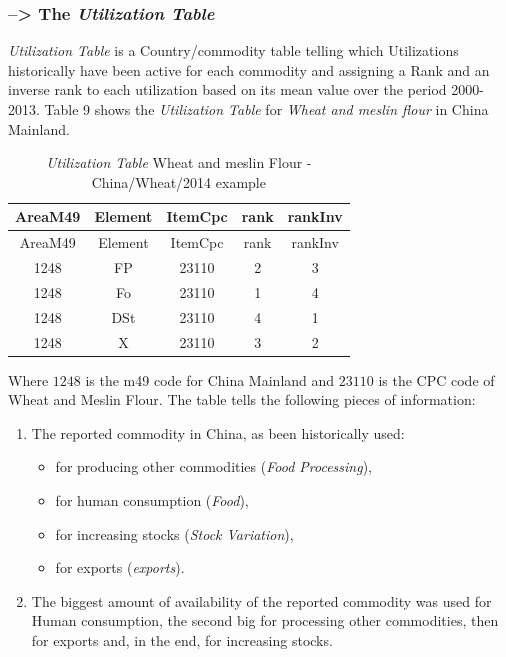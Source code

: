 \documentclass[]{article}
\providecommand{\tightlist}{%
  \setlength{\itemsep}{0pt}\setlength{\parskip}{0pt}}
\begin{document}
\subsubsection*{\texorpdfstring{--\textgreater{} The \emph{Utilization
Table}}{--\textgreater{} The Utilization Table}}\label{the-utilization-table}

\emph{Utilization Table} is a Country/commodity table telling which
Utilizations historically have been active for each commodity and
assigning a Rank and an inverse rank to each utilization based on its
mean value over the period 2000-2013. Table 9 shows the
\emph{Utilization Table} for \emph{Wheat and meslin flour} in China
Mainland.

\begin{longtable}[]{@{}ccccc@{}}
\caption{\emph{Utilization Table} Wheat and meslin Flour -
China/Wheat/2014 example}\tabularnewline
\toprule
AreaM49 & Element & ItemCpc & rank & rankInv\tabularnewline
\midrule
\endfirsthead
\toprule
AreaM49 & Element & ItemCpc & rank & rankInv\tabularnewline
\midrule
\endhead
1248 & FP & 23110 & 2 & 3\tabularnewline
1248 & Fo & 23110 & 1 & 4\tabularnewline
1248 & DSt & 23110 & 4 & 1\tabularnewline
1248 & X & 23110 & 3 & 2\tabularnewline
\bottomrule
\end{longtable}

Where \(1248\) is the m49 code for China Mainland and \(23110\) is the
CPC code of Wheat and Meslin Flour. The table tells the following pieces
of information:

\begin{enumerate}
\def\labelenumi{\arabic{enumi}.}
\tightlist
\item
  The reported commodity in China, as been historically used:

  \begin{itemize}
  \tightlist
  \item
    for producing other commodities (\emph{Food Processing}),
  \item
    for human consumption (\emph{Food}),
  \item
    for increasing stocks (\emph{Stock Variation}),
  \item
    for exports (\emph{exports}).
  \end{itemize}
\item
  The biggest amount of availability of the reported commodity was used
  for Human consumption, the second big for processing other
  commodities, then for exports and, in the end, for increasing stocks.
\end{enumerate}
\end{document}
